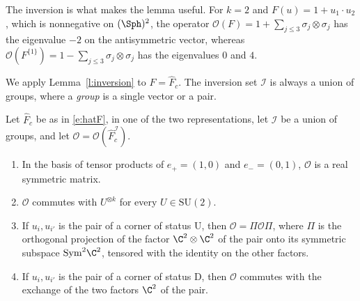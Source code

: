 The inversion is what makes the lemma useful. For $k = 2$ and $F(u) = 1 + u_1 \cdot u_2$, which is nonnegative on $(\Sph)^2$, the operator $\mathcal O(F) = 1 + \sum_{j \le 3} \sigma_j \otimes \sigma_j$ has the eigenvalue $-2$ on the antisymmetric vector, whereas $\mathcal O(F^{\{1\}}) = 1 - \sum_{j \le 3} \sigma_j \otimes \sigma_j$ has the eigenvalues $0$ and $4$.

We apply Lemma~\ref{l:inversion} to $F = \hat F_c$. The inversion set $\mathcal I$ is always a union of groups, where a \emph{group} is a single vector or a pair.

\begin{lemma}\label{l:Ostruct}
Let $\hat F_c$ be as in \eqref{e:hatF}, in one of the two representations, let $\mathcal I$ be a union of groups, and let $\mathcal O = \mathcal O(\hat F_c^{\mathcal I})$.
\begin{enumerate}
\item In the basis of tensor products of $e_+ = (1, 0)$ and $e_- = (0, 1)$, $\mathcal O$ is a real symmetric matrix.
\item $\mathcal O$ commutes with $U^{\otimes k}$ for every $U \in \mathrm{SU}(2)$.
\item If $u_i, u_{i'}$ is the pair of a corner of status $\mathrm U$, then $\mathcal O = \Pi \mathcal O \Pi$, where $\Pi$ is the orthogonal projection of the factor $\C^2 \otimes \C^2$ of the pair onto its symmetric subspace $\mathrm{Sym}^2 \C^2$, tensored with the identity on the other factors.
\item If $u_i, u_{i'}$ is the pair of a corner of status $\mathrm D$, then $\mathcal O$ commutes with the exchange of the two factors $\C^2$ of the pair.
\end{enumerate}
\end{lemma}

